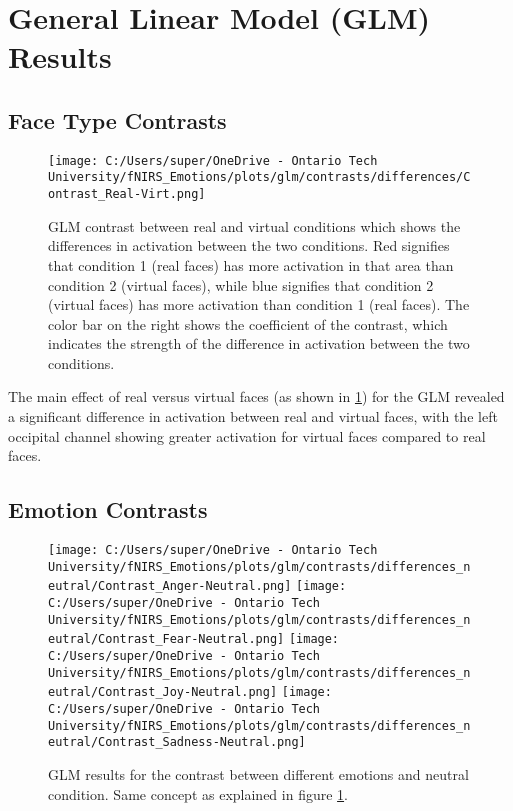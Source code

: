 \section{General Linear Model (GLM) Results}
\subsection{Face Type Contrasts}
\begin{figure}[H]
    \centering
      \texttt{[image: C:/Users/super/OneDrive - Ontario Tech University/fNIRS\_Emotions/plots/glm/contrasts/differences/Contrast\_Real-Virt.png]}
      \caption[GLM: Real vs. Virtual Faces]{GLM contrast between real and virtual conditions which shows the differences in activation between the two conditions.
      Red signifies that condition 1 (real faces) has more activation in that area than condition 2 (virtual faces), while blue signifies that condition 2 (virtual faces) has more activation than condition 1 (real faces).
      The color bar on the right shows the coefficient of the contrast, which indicates the strength of the difference in activation between the two conditions.}
      \label{fig:glm_real_vs_virtual}
\end{figure}

The main effect of real versus virtual faces (as shown in \ref{fig:glm_real_vs_virtual}) for the GLM revealed a significant difference in activation between real and virtual faces, with the left occipital channel showing greater activation for virtual faces compared to real faces.

\subsection{Emotion Contrasts}
\begin{figure}[H]
    \centering
    \texttt{[image: C:/Users/super/OneDrive - Ontario Tech University/fNIRS\_Emotions/plots/glm/contrasts/differences\_neutral/Contrast\_Anger-Neutral.png]}
    \texttt{[image: C:/Users/super/OneDrive - Ontario Tech University/fNIRS\_Emotions/plots/glm/contrasts/differences\_neutral/Contrast\_Fear-Neutral.png]}
    \texttt{[image: C:/Users/super/OneDrive - Ontario Tech University/fNIRS\_Emotions/plots/glm/contrasts/differences\_neutral/Contrast\_Joy-Neutral.png]}
    \texttt{[image: C:/Users/super/OneDrive - Ontario Tech University/fNIRS\_Emotions/plots/glm/contrasts/differences\_neutral/Contrast\_Sadness-Neutral.png]}
    \caption[GLM: Emotion vs. Neutral]{GLM results for the contrast between different emotions and neutral condition.
    Same concept as explained in figure \ref{fig:glm_real_vs_virtual}. }
    \label{fig:glm_emotion_analysis_neutral}
\end{figure}

